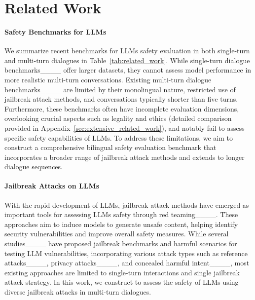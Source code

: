 \section{Related Work}
\paragraph{Safety Benchmarks for LLMs}
We summarize recent benchmarks for LLMs safety evaluation in both single-turn and multi-turn dialogues in Table~\ref{tab:related_work}. While single-turn dialogue benchmarks____ offer larger datasets, they cannot assess model performance in more realistic multi-turn conversations. Existing multi-turn dialogue benchmarks____ are limited by their monolingual nature, restricted use of jailbreak attack methods, and conversations typically shorter than five turns. Furthermore, these benchmarks often have incomplete evaluation dimensions, overlooking crucial aspects such as legality and ethics (detailed comparison provided in Appendix~\ref{sec:extensive_related_work}), and notably fail to assess specific safety capabilities of LLMs. 
To address these limitations, we aim to construct a comprehensive bilingual safety evaluation benchmark that incorporates a broader range of jailbreak attack methods and extends to longer dialogue sequences.

\paragraph{Jailbreak Attacks on LLMs}
With the rapid development of LLMs, jailbreak attack methods have emerged as important tools for assessing LLMs safety through red teaming____. These approaches aim to induce models to generate unsafe content, helping identify security vulnerabilities and improve overall safety measures.
While several studies____ have proposed jailbreak benchmarks and harmful scenarios for testing LLM vulnerabilities, incorporating various attack types such as reference attacks____, privacy attacks____, and concealed harmful intent____, most existing approaches are limited to single-turn interactions and single jailbreak attack strategy. In this work, we construct \benchmark to assess the safety of LLMs using diverse jailbreak attacks in multi-turn dialogues.